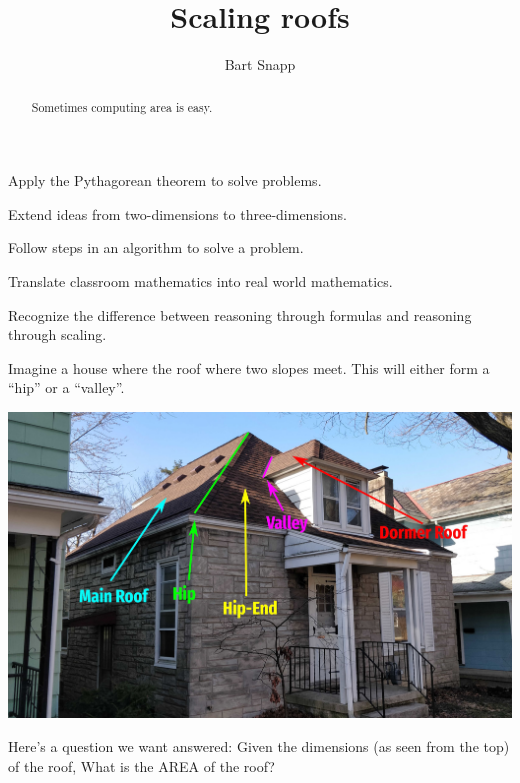 \documentclass[hints,nooutcomes,noauthor,handout]{ximera}
\title{Scaling roofs}
\author{Bart Snapp}
\begin{document}
\begin{abstract}
  Sometimes computing area is easy.
\end{abstract}
\maketitle


\begin{listOutcomes}
\item Apply the Pythagorean theorem to solve problems.
\item Extend ideas from two-dimensions to three-dimensions.
\item Follow steps in an algorithm to solve a problem.
\item Translate classroom mathematics into real world mathematics.
\item Recognize the difference between reasoning through formulas and
  reasoning through scaling.
\end{listOutcomes}


Imagine a house where the roof where two slopes meet. This will either
form a ``hip'' or a ``valley''.
\begin{center}
  \includegraphics[width=.8\textwidth]{house.jpg}
\end{center}
Here's a question we want answered:
Given the dimensions (as seen from the top) of the roof, What is the AREA of the roof?



\mynewpage
\end{document}
